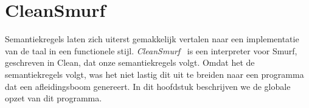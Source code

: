 \section{CleanSmurf}
\label{sec:cleansmurf}

Semantiekregels laten zich uiterst gemakkelijk vertalen naar een implementatie
van de taal in een functionele stijl. \emph{CleanSmurf}~\cite{cleansmurf} is
een interpreter voor Smurf, geschreven in Clean, dat onze semantiekregels
volgt. Omdat het de semantiekregels volgt, was het niet lastig dit uit te
breiden naar een programma dat een afleidingsboom genereert. In dit hoofdstuk
beschrijven we de globale opzet van dit programma.





